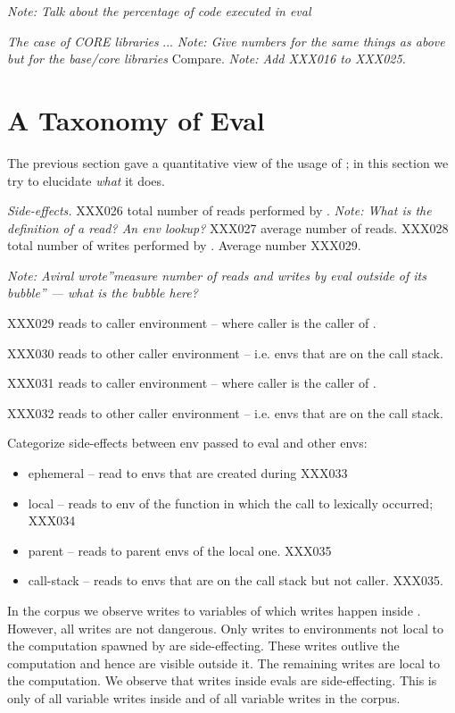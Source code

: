 \documentclass[USenglish,cleveref, autoref, thm-restate]{lipics-v2019}
\newcommand{\mypara}[1]{\medskip\noindent\emph{#1}\xspace}
\newcommand{\NOTE}[1]{{\it Note: #1}\xspace}
\begin{document}
\NOTE{Talk about the percentage of code executed in eval}

\mypara{The case of CORE libraries} ... \NOTE{Give numbers for the
  same things as above but for the base/core libraries} Compare.
\NOTE{Add XXX016 to XXX025.}

\section{A Taxonomy of Eval}

The previous section gave a quantitative view of the usage of \eval;
in this section we try to elucidate \emph{what} it does.


\mypara{Side-effects.}
XXX026 total number of reads performed by \eval. \NOTE{What is the definition of a read?  An env lookup?}  XXX027 average number of reads.
XXX028 total number of writes performed by \eval. Average number XXX029.

\NOTE{Aviral wrote''measure number of reads and writes by eval outside
  of its bubble'' --- what is the bubble here?}

XXX029 reads to caller environment -- where caller is the caller of \eval.

XXX030 reads to other caller environment -- i.e. envs that are on the call stack.

XXX031 reads to caller environment -- where caller is the caller of \eval.

XXX032 reads to other caller environment -- i.e. envs that are on the call stack.

Categorize side-effects between env passed to eval and other envs:
\begin{itemize}
\item ephemeral -- read to envs that are created during \eval  XXX033
\item local -- reads to env of the function in which the call to \eval
  lexically occurred; XXX034
\item parent -- reads to parent envs of the local one. XXX035
\item call-stack -- reads to envs that are on the call stack but not
  caller. XXX035.
\end{itemize}

In the corpus we observe \AllWritesRnd writes to variables of which
\EvalWritesRnd writes happen inside \eval. However, all writes are not
dangerous. Only writes to environments not local to the computation
spawned by \eval are side-effecting. These writes outlive the
computation and hence are visible outside it. The remaining writes are
local to the computation. We observe that \EvalSideEffectingWritesRnd
writes inside evals are side-effecting. This is only
\EvalSideEffectingWritesEvalPerc of all variable writes inside \eval
and \EvalSideEffectingWritesAllPerc of all variable writes in the
corpus.
\end{document}
